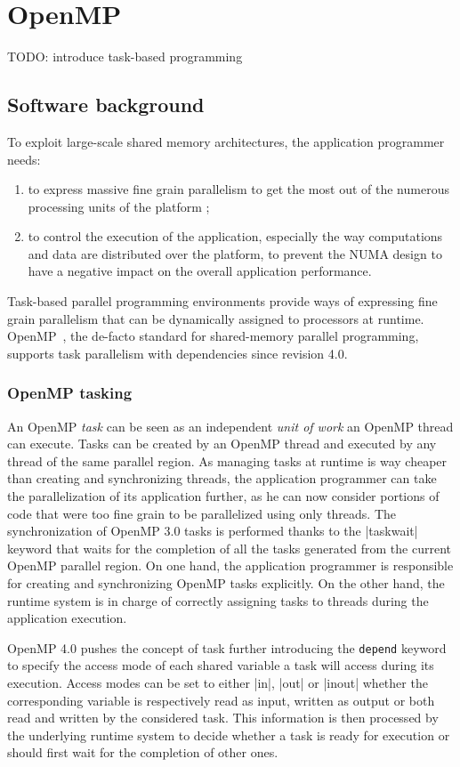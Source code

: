 \section{OpenMP}\label{sec:context:openmp}

TODO: introduce task-based programming

\subsection{Software background}

To exploit  large-scale shared memory architectures, the application programmer needs:
\begin{enumerate}
\item to express massive fine grain parallelism to get the most out of the numerous processing units of the platform ;
\item to control the execution of the application, especially the way computations and data are distributed over the platform, to prevent the NUMA design to have a negative impact on the overall application performance.
\end{enumerate}

Task-based parallel programming environments provide ways of expressing fine grain parallelism that can be dynamically assigned to processors at runtime.
OpenMP~\cite{openmp40}, the de-facto standard for shared-memory parallel programming, supports task parallelism with dependencies since revision 4.0.

\subsubsection{OpenMP tasking}

An OpenMP \emph{task} can be seen as an independent \emph{unit of work} an OpenMP thread can execute.
Tasks can be created by an OpenMP thread and executed by any thread of the same parallel region.
As managing tasks at runtime is way cheaper than creating and synchronizing threads, the application programmer can take the parallelization of its application further, as he can now consider portions of code that were too fine grain to be parallelized using only threads.
The synchronization of OpenMP 3.0 tasks is performed thanks to the |taskwait| keyword that waits for the completion of all the tasks generated from the current OpenMP parallel region.
On one hand, the application programmer is responsible for creating and synchronizing OpenMP tasks explicitly.
On the other hand, the runtime system is in charge of correctly assigning tasks to threads during the application execution.

OpenMP 4.0 pushes the concept of task further introducing the \verb/depend/ keyword to specify the access mode of each shared variable a task will access during its execution.
Access modes can be set to either |in|, |out| or |inout| whether the corresponding variable is respectively read as input, written as output or both read and written by the considered task.
This information is then processed by the underlying runtime system to decide whether a task is ready for execution or should first wait for the completion of other ones.

